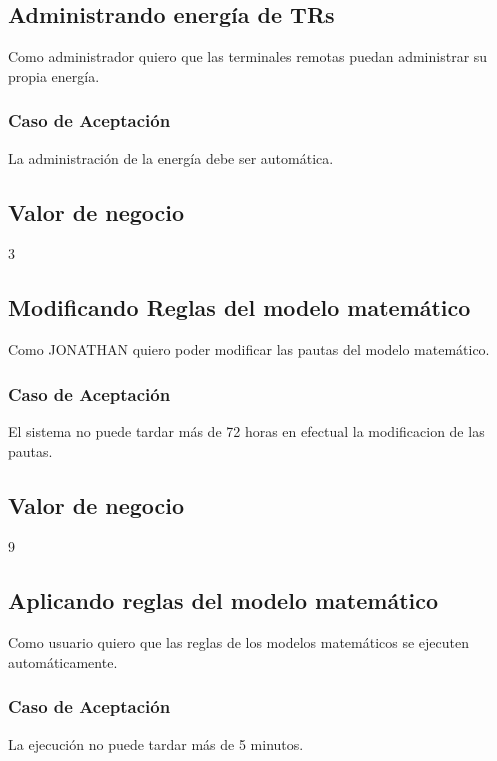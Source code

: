 \linea \subsection*{Administrando energía de TRs}
Como administrador quiero que las terminales remotas puedan administrar su propia energía.
\subsubsection*{Caso de Aceptación}
La administración de la energía debe ser automática.
\subsection*{Valor de negocio}
3

\linea \subsection*{Modificando Reglas del modelo matemático}
Como JONATHAN %
 quiero poder modificar las pautas del modelo matemático.
\subsubsection*{Caso de Aceptación}
El sistema no puede tardar más de 72 horas en efectual la modificacion de las pautas.
\subsection*{Valor de negocio}
9

\linea \subsection*{Aplicando reglas del modelo matemático}
Como usuario quiero que las reglas de los modelos matemáticos se ejecuten automáticamente.
\subsubsection*{Caso de Aceptación}
La ejecución no puede tardar más de 5 minutos.
